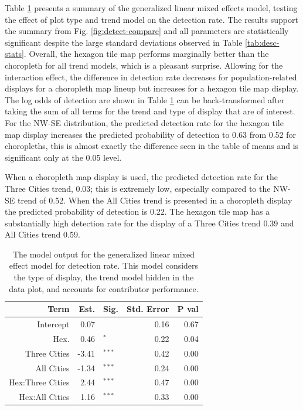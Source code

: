 \documentclass[journal]{vgtc}                     %
\begin{document}
Table \ref{tab:detect-glmer1} presents a summary of the generalized linear mixed effects model, testing the effect of plot type and trend model on the detection rate. The results support the summary from Fig. \ref{fig:detect-compare} and all parameters are statistically significant despite the large standard deviations observed in Table \ref{tab:desc-stats}. Overall, the hexagon tile map performs marginally better than the choropleth for all trend models, which is a pleasant surprise. Allowing for the interaction effect, the difference in detection rate decreases for population-related displays for a choropleth map lineup but increases for a hexagon tile map display.
The log odds of detection are shown in Table \ref{tab:detect-glmer1} can be back-transformed after taking the sum of all terms for the trend and type of display that are of interest.
For the NW-SE distribution, the predicted detection rate for the hexagon tile map display increases the predicted probability of detection to 0.63 from 0.52 for choropleths, this is almost exactly the difference seen in the table of means and is significant only at the 0.05 level.

When a choropleth map display is used, the predicted detection rate for the Three Cities trend, 0.03; this is extremely low, especially compared to the NW-SE trend of 0.52.
When the All Cities trend is presented in a choropleth display the predicted probability of detection is 0.22.
The hexagon tile map has a substantially high detection rate for the display of a Three Cities trend 0.39 and All Cities trend 0.59.

\begin{table}[h]

\caption{\label{tab:detect-glmer1}The model output for the generalized linear mixed effect model for detection rate. This model considers the type of display, the trend model hidden in the data plot, and accounts for contributor performance.}
\centering
\begin{tabular}[t]{rrlrr}
\toprule
Term & Est. & Sig. & Std. Error & P val\\
\midrule
Intercept & 0.07 & $^{ }$ & 0.16 & 0.67\\
Hex. & 0.46 & $^{*}$ & 0.22 & 0.04\\
\addlinespace
Three Cities & -3.41 & $^{***}$ & 0.42 & 0.00\\
All Cities & -1.34 & $^{***}$ & 0.24 & 0.00\\
\addlinespace
Hex:Three Cities & 2.44 & $^{***}$ & 0.47 & 0.00\\
Hex:All Cities & 1.16 & $^{***}$ & 0.33 & 0.00\\
\bottomrule
\end{tabular}
\end{table}
\end{document}
